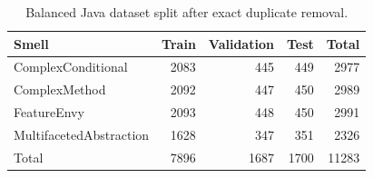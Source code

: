 \begin{table}[H]
\centering
\begin{tabular}{lrrrr}
\toprule
Smell & Train & Validation & Test & Total \\
\midrule
ComplexConditional & 2083 & 445 & 449 & 2977 \\
ComplexMethod & 2092 & 447 & 450 & 2989 \\
FeatureEnvy & 2093 & 448 & 450 & 2991 \\
MultifacetedAbstraction & 1628 & 347 & 351 & 2326 \\
\midrule
Total & 7896 & 1687 & 1700 & 11283 \\
\bottomrule
\end{tabular}
\caption{Balanced Java dataset split after exact duplicate removal.}
\label{tab:dataset-split}
\end{table}
